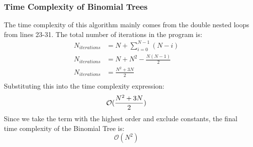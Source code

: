\documentclass[12pt]{article}
\numberwithin{equation}{section}
\begin{document}
\newline
\newline
\subsubsection{Time Complexity of Binomial Trees}
The time complexity of this algorithm mainly comes from the double nested loops from lines 23-31. The total number of iterations in the program is:
\begin{equation}
	\begin{aligned}
	N_{iterations} &= N + \sum_{i = 0}^{N - 1} (N-i) \\
	N_{iterations} &= N + N^2 - \frac{N(N-1)}{2} \\
	N_{iterations} &= \frac{N^2 + 3N}{2} \\
	\end{aligned}
\end{equation}
Substituting this into the time complexity expression:
\begin{equation*}
		 \mathcal{O}(\frac{N^2 + 3N}{2}) \\ 
\end{equation*}
Since we take the term with the highest order and exclude constants, the final time complexity of the Binomial Tree is:
\begin{equation}
	\boxed{\mathcal{O}(N^2) }
\end{equation}
\end{document}
